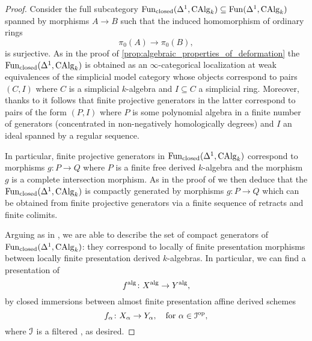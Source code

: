 \documentclass[10pt,a4paper,reqno]{amsart} %
\theoremstyle{plain}
\theoremstyle{definition}
\theoremstyle{remark}
\numberwithin{equation}{section}
\begin{document}
\begin{proof}
    Consider the full subcategory $\operatorname{Fun}_\mathrm{closed}(\Delta^1, \mathrm{CAlg}_k) \subseteq \operatorname{Fun} (\Delta^1, \mathrm{CAlg}_k)$ spanned by morphisms $A \to B$
    such that the induced homomorphism of ordinary rings
        \[
            \pi_0(A) \to \pi_0(B),  
        \]
    is surjective. As in the proof of \cref{prop:algebraic_properties_of_deformation} the \infcat $\operatorname{Fun}_\mathrm{closed}(\Delta^1, \mathrm{CAlg}_k)$
    is obtained as an $\infty$-categorical localization at weak equivalences of the simplicial model category whose objects correspond to pairs $(C, I)$ where $C$ is a simplicial $k$-algebra
    and $I \subseteq C$ a simplicial ring. Moreover, thanks to \cite[\S 2 IV, Theorem 4]{Quillen_Homotopical_1967} it follows that
    finite projective generators in the latter correspond to pairs of the form $(P, I)$ where $P$ is some polynomial algebra in a finite number of generators
    (concentrated in non-negatively homologically degrees)
    and $I$ an ideal spanned by a regular sequence. 
    
    In particular, finite projective generators in $\operatorname{Fun}_\mathrm{closed}(\Delta^1, \mathrm{CAlg}_k)$ correspond
    to morphisms $g \colon P \to Q$ where $P$ is a finite free derived $k$-algebra and the morphism $g$ is a complete intersection morphism.
    As in the proof of \cite[Proposition 8.2.5.27]{Lurie_Higher_algebra} we then deduce that the \infcat $\mathrm{Fun}_\mathrm{closed}(\Delta^1, \mathrm{CAlg}_k)$ is compactly generated by
    morphisms $g \colon P \to Q$ which can be obtained from finite projective generators via a finite sequence of retracts and finite colimits.

    Arguing as in \cite[Proposition 8.2.5.27]{Lurie_Higher_algebra}, we are able to describe the set of compact generators of $\operatorname{Fun}_\mathrm{closed}(\Delta^1, \mathrm{CAlg}_k)$: they correspond to
    locally of finite presentation morphisms between locally finite presentation derived $k$-algebras. In particular, we can find a presentation
    of
        \[
            f^\mathrm{alg} \colon X^\mathrm{alg} \to Y^\mathrm{alg},  
        \]
    by closed immersions between almost finite presentation affine derived schemes
        \[
            f_\alpha \colon X_\alpha \to Y_\alpha, \quad \mathrm{for \ } \alpha \in \mathcal I^\mathrm{op},  
        \]
    where $\mathcal I$ is a filtered \infcat, as desired.
\end{proof}
%
%
%
\end{document}
